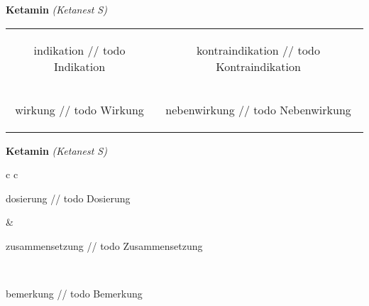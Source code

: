 \documentclass[12pt]{beamer}
\begin{document}
\begin{frame}{
    \textbf{Ketamin}
    \textit{(Ketanest S)}
}
    \begin{tabular}{c c}
        \begin{beamercolorbox}[wd=\boxwidth\textwidth,ht=\boxheight\textheight,sep=1em]{indikation}
        // todo Indikation
        \end{beamercolorbox} & 
        \begin{beamercolorbox}[wd=\boxwidth\textwidth,ht=\boxheight\textheight,sep=1em]{kontraindikation}
        // todo Kontraindikation 
        \end{beamercolorbox} \\
        \begin{beamercolorbox}[wd=\boxwidth\textwidth,ht=\boxheight\textheight,sep=1em]{wirkung}
        // todo Wirkung
        \end{beamercolorbox} & 
        \begin{beamercolorbox}[wd=\boxwidth\textwidth,ht=\boxheight\textheight,sep=1em]{nebenwirkung}
        // todo Nebenwirkung
        \end{beamercolorbox} \\
    \end{tabular}
\end{frame}

\begin{frame}{
    \textbf{Ketamin}
    \textit{(Ketanest S)}
}
    \begin{tabular}{c c}
        \begin{beamercolorbox}[wd=\boxwidth\textwidth,ht=\boxheight\textheight,sep=1em]{dosierung}
        // todo Dosierung
        \end{beamercolorbox} & 
        \begin{beamercolorbox}[wd=\boxwidth\textwidth,ht=\boxheight\textheight,sep=1em]{zusammensetzung}
        // todo Zusammensetzung
        \end{beamercolorbox} \\
        \begin{beamercolorbox}[wd=\textwidth,ht=\boxheight\textheight,sep=1em]{bemerkung}
        // todo Bemerkung
        \end{beamercolorbox} \\
    \end{tabular}
\end{frame}
\end{document}

